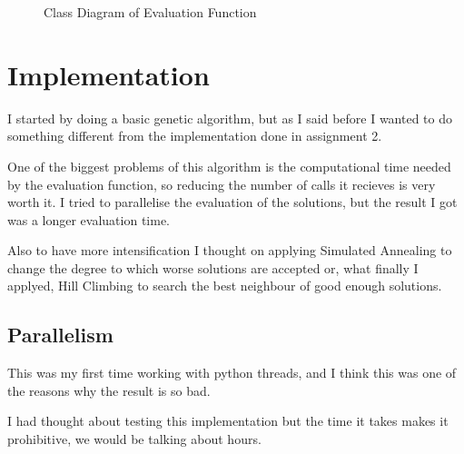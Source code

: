 \documentclass{article}
\begin{document}
\begin{figure}[H]

        \caption{Class Diagram of Evaluation Function}
        \label{Class Diagram of Evaluation Function}
    \end{figure}

    \section{Implementation}

    I started by doing a basic genetic algorithm, but as I said before 
    I wanted to do something different from the implementation done in assignment 2.

    One of the biggest problems of this algorithm is the computational time needed by the evaluation function,
    so reducing the number of calls it recieves is very worth it. I tried to parallelise the evaluation of the solutions, 
    but the result I got was a longer evaluation time. 

    Also to have more intensification I thought on applying Simulated Annealing to change the degree to which worse solutions are accepted
    or, what finally I applyed, Hill Climbing to search the best neighbour of good enough solutions.

    \subsection{Parallelism}

    This was my first time working with python threads, and I think this was one of the reasons why the result is so bad.

    I had thought about testing this implementation but the time it takes makes it prohibitive, we would be talking about hours.
\end{document}
